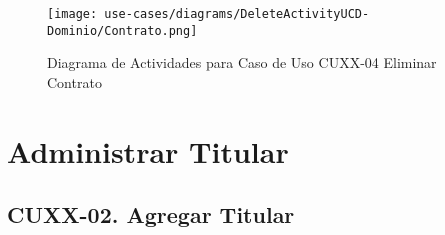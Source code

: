 	\begin{figure}[H]
	  \begin{center}
		 \label{tab:activity-delete-ucd-entity-contrato}
		 \texttt{[image: use-cases/diagrams/DeleteActivityUCD-Dominio/Contrato.png]}
		 \caption{Diagrama de Actividades para Caso de Uso CUXX-04 Eliminar Contrato}
	  \end{center}
	\end{figure}
	
	\clearpage
	\section{Administrar Titular} \label{sec:cf-uc-admin-titularcontrato}
	
	\clearpage
	\subsection{CUXX-02. Agregar Titular} \label{sec:cu-create-TitularContrato}
	
